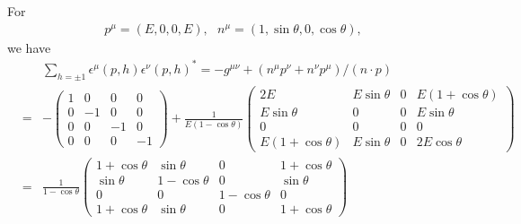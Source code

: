 \documentclass[11pt]{article}
\def\eps{\epsilon}
\begin{document}
\section{ }
For 
\begin{eqnarray}
    p^\mu = (E, 0, 0, E),~~~n^\mu = (1,\sin\theta, 0, \cos\theta),
\end{eqnarray}
we have
\begin{eqnarray}
    &&\sum_{h=\pm 1} \eps^\mu(p,h) \eps^\nu(p,h)^*
      = -g^{\mu\nu} + (n^\mu p^\nu + n^\nu p^\mu)/(n\cdot p) \\
    &=&-
    \begin{pmatrix}
        1 & 0 & 0 & 0 \\
        0 & -1& 0 & 0 \\
        0 & 0 & -1& 0 \\
        0 & 0 & 0 & -1
    \end{pmatrix}
    +\frac{1}{E(1-\cos\theta)}
    \begin{pmatrix}
        2E & E\sin\theta  & 0 & E(1+\cos\theta) \\
        E\sin\theta & 0 & 0 & E\sin\theta \\
        0 & 0 & 0 & 0 \\
        E(1+\cos\theta) & E\sin\theta & 0 & 2E\cos\theta
    \end{pmatrix} \\
    &=&\frac{1}{1-\cos\theta}
    \begin{pmatrix}
        1+\cos\theta & \sin\theta & 0 & 1+\cos\theta \\
        \sin\theta & 1-\cos\theta & 0 & \sin\theta \\
        0 & 0 & 1-\cos\theta & 0 \\
        1+\cos\theta & \sin\theta & 0 & 1+\cos\theta
    \end{pmatrix}
\end{eqnarray}
\end{document}
